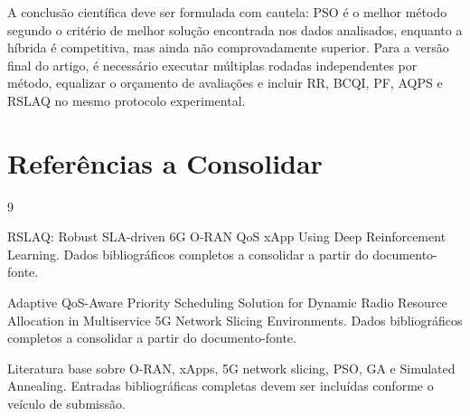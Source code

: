 \documentclass[12pt,a4paper]{article}
\begin{document}
A conclusão científica deve ser formulada com cautela: PSO é o melhor método segundo o critério de melhor solução encontrada nos dados analisados, enquanto a híbrida é competitiva, mas ainda não comprovadamente superior. Para a versão final do artigo, é necessário executar múltiplas rodadas independentes por método, equalizar o orçamento de avaliações e incluir RR, BCQI, PF, AQPS e RSLAQ no mesmo protocolo experimental.

\section*{Referências a Consolidar}

\begin{thebibliography}{9}

RSLAQ: Robust SLA-driven 6G O-RAN QoS xApp Using Deep Reinforcement Learning. Dados bibliográficos completos a consolidar a partir do documento-fonte.

Adaptive QoS-Aware Priority Scheduling Solution for Dynamic Radio Resource Allocation in Multiservice 5G Network Slicing Environments. Dados bibliográficos completos a consolidar a partir do documento-fonte.

Literatura base sobre O-RAN, xApps, 5G network slicing, PSO, GA e Simulated Annealing. Entradas bibliográficas completas devem ser incluídas conforme o veículo de submissão.

\end{thebibliography}
\end{document}
